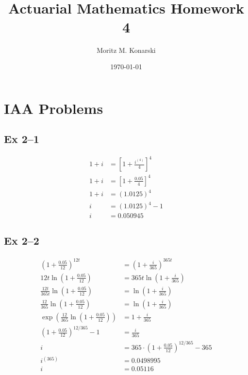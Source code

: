 \documentclass[a4paper, 12pt, reqno]{amsart}
\title{Actuarial Mathematics Homework 4}
\author{Moritz M. Konarski}
\date{\today}
\numberwithin{equation}{section}
\begin{document}
\maketitle

\section{IAA Problems}

\subsection*{Ex 2--1}

\begin{equation}\nonumber
    \begin{aligned}
        1 + i &= \left[ 1 + \frac{i^{(4)}}{4} \right]^4     \\
        1 + i &= \left[ 1 + \frac{0.05}{4} \right]^4        \\
        1 + i &= (1.0125)^4                                 \\
        i &= (1.0125)^4 - 1                                 \\
        i &= 0.050945
    \end{aligned}
\end{equation}

\subsection*{Ex 2--2}

\begin{equation}\nonumber
    \begin{aligned}
        \left(1 + \frac{0.05}{12} \right)^{12t} &= 
            \left(1 + \frac{i}{365} \right)^{365t}      \\
        12t\ln\left(1 + \frac{0.05}{12} \right) &= 
            365t\ln\left(1 + \frac{i}{365} \right)      \\
        \frac{12t}{365t}\ln\left(1 + \frac{0.05}{12} \right) &= 
            \ln\left(1 + \frac{i}{365} \right)      \\
        \frac{12}{365}\ln\left(1 + \frac{0.05}{12} \right) &= 
            \ln\left(1 + \frac{i}{365} \right)      \\
        \exp\left(\frac{12}{365}\ln\left(1 + \frac{0.05}{12} \right)\right) &= 
            1 + \frac{i}{365}      \\
        \left(1 + \frac{0.05}{12} \right)^{12/365} - 1 &= \frac{i}{365} \\
        i &= 365 \cdot \left(1 + \frac{0.05}{12} \right)^{12/365} - 365 \\
        i^{(365)} &= 0.0498995                         \\
        i &= 0.05116
    \end{aligned}
\end{equation}
\end{document}
